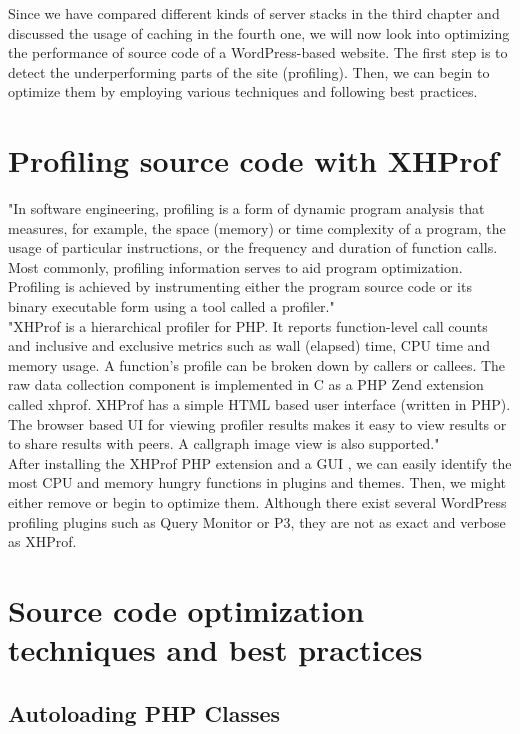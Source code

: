 Since we have compared different kinds of \gls{server stack}s in the third chapter and discussed the usage of caching in the fourth one, we will now look into optimizing the performance of source code of a WordPress-based website. The first step is to detect the underperforming parts of the site (profiling). Then, we can begin to optimize them by employing various techniques and following best practices.

\section{Profiling source code with XHProf}

"In software engineering, profiling is a form of dynamic program analysis that measures, for example, the space (memory) or time complexity of a program, the usage of particular instructions, or the frequency and duration of function calls. Most commonly, profiling information serves to aid program optimization. Profiling is achieved by instrumenting either the program source code or its binary executable form using a tool called a profiler." \cite{Wiki:Profiling} \\

"XHProf is a hierarchical profiler for PHP. It reports function-level call counts and inclusive and exclusive metrics such as wall (elapsed) time, CPU time and memory usage. A function's profile can be broken down by callers or callees. The raw data collection component is implemented in C as a PHP Zend extension called xhprof. XHProf has a simple HTML based user interface (written in PHP). The browser based UI for viewing profiler results makes it easy to view results or to share results with peers. A callgraph image view is also supported." \cite{XHProf:About} \\

After installing the XHProf PHP extension and a GUI \cite{Lamosty.com:XHProf}, we can easily identify the most CPU and memory hungry functions in plugins and themes. Then, we might either remove or begin to optimize them. Although there exist several WordPress profiling plugins such as Query Monitor or P3, they are not as exact and verbose as XHProf.

\section{Source code optimization techniques and best practices}

\subsection{Autoloading PHP Classes}

